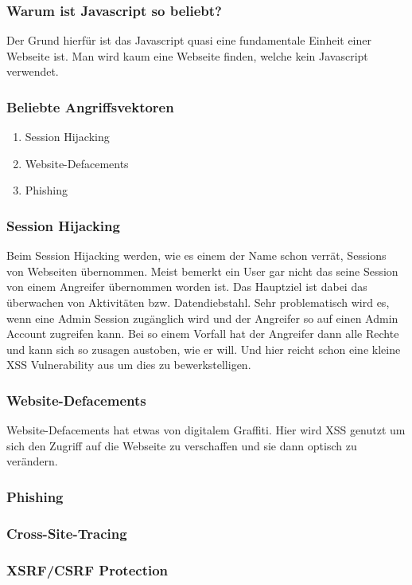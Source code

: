 \subsubsection{Warum ist Javascript so beliebt?}
Der Grund hierfür ist das Javascript quasi eine fundamentale Einheit einer Webseite ist. Man wird kaum eine Webseite finden, welche kein Javascript verwendet.
\subsubsection{Beliebte Angriffsvektoren}
\begin{enumerate}
\item Session Hijacking
\item Website-Defacements 
\item Phishing
\end{enumerate}
\subsubsection{Session Hijacking}
Beim Session Hijacking werden, wie es einem der Name schon verrät, Sessions von Webseiten übernommen. Meist bemerkt ein User gar nicht das seine Session von einem Angreifer übernommen worden ist. Das Hauptziel ist dabei das überwachen von Aktivitäten bzw. Datendiebstahl. Sehr problematisch wird es, wenn eine Admin Session zugänglich wird und der Angreifer so auf einen Admin Account zugreifen kann. Bei so einem Vorfall hat der Angreifer dann alle Rechte und kann sich so zusagen austoben, wie er will. Und hier reicht schon eine kleine XSS Vulnerability aus um dies zu bewerkstelligen. 
\subsubsection{Website-Defacements}
Website-Defacements hat etwas von digitalem Graffiti. Hier wird XSS genutzt um sich den Zugriff auf die Webseite zu verschaffen und sie dann optisch zu verändern. 

\subsubsection{Phishing}
\subsubsection{Cross-Site-Tracing}
\subsubsection{XSRF/CSRF Protection}
\label{sec:csrf}
